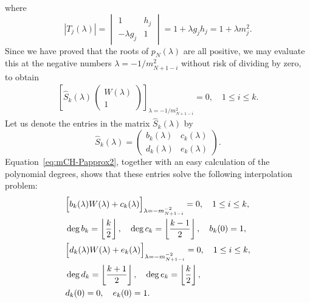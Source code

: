 \documentclass[10pt,a4paper]{article} \pdfoutput=1 
\begin{document}
where
\begin{equation*}
  |T_j(\lambda)|
  = \begin{vmatrix} 1 & h_j \\ -\lambda g_j & 1 \end{vmatrix}
  = 1 + \lambda g_j h_j
  = 1 + \lambda m_j^2
  .
\end{equation*}
Since we have proved that the roots of $p_{N}(\lambda)$ are all positive,
we may evaluate this at the negative numbers
$\lambda = -1 / m_{N+1-i}^2$
without risk of dividing by zero,
to obtain
\begin{gather} \label{eq:mCH-Papprox2}
  \left[
    \widehat S_k(\lambda)
    \,
    \begin{pmatrix} W(\lambda) \\ 1 \end{pmatrix}
  \right]_{\lambda = -1 / m_{N+1-i}^2}
  =0
  ,\quad
  1 \le i \le k
  .
\end{gather}
Let us denote the entries in the matrix $\widehat S_k(\lambda)$ by
\begin{equation}
  \widehat S_k(\lambda) = \begin{pmatrix} b_k(\lambda) & c_k(\lambda) \\ d_k(\lambda) & e_k(\lambda) \end{pmatrix}
  .
\end{equation}
Equation~\eqref{eq:mCH-Papprox2}, together with an easy calculation of the polynomial degrees,
shows that these entries solve the following interpolation problem:
\begin{subequations}\label{eq:mCH-Papprox}
  \begin{align}
    \label{eq:mCH-Papprox-bc}
    &
    \Bigl[ b_k(\lambda) W(\lambda) + c_k(\lambda) \Bigr]_{\lambda = - m_{N+1-i}^{-2}} = 0
    , \quad
    1 \le i \le k
    , \\ &
    \deg b_k = \left\lfloor \frac{k}{2} \right\rfloor
    , \quad
    \deg c_k = \left\lfloor \frac{k-1}{2} \right\rfloor
    , \quad
    b_k(0) = 1
    , \\ &
    \label{eq:mCH-Papprox-de}
    \Bigl[ d_k(\lambda) W(\lambda) + e_k(\lambda) \Bigr]_{\lambda = - m_{N+1-i}^{-2}} = 0
    ,\quad
    1 \le i \le k
    , \\ &
    \deg d_k = \left\lfloor \frac{k+1}{2} \right\rfloor
    , \quad
    \deg e_k = \left\lfloor \frac{k}{2} \right\rfloor
    ,
    \notag
    \\ &
    d_k(0) = 0
    , \quad
    e_k(0) = 1
    .
  \end{align}
\end{subequations}
\end{document}
